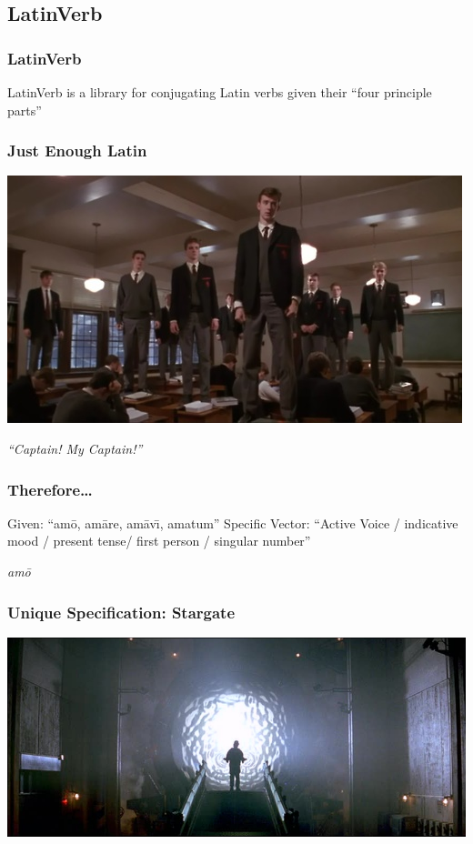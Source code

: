 \documentclass[slidestop,compress,mathserif]{beamer}
\begin{document}
\subsection{LatinVerb} %
\label{sub:_modeling_thought_in_latinverb}

\begin{frame}
	\frametitle{LatinVerb}
	LatinVerb is a library for conjugating Latin verbs given their ``four principle parts''
\end{frame}

\begin{frame}
	\frametitle{Just Enough Latin}
	\vskip 0.5cm
	\begin{center}
		\includegraphics[scale=0.45]{img/captain.jpg}
	\end{center}
	
	\vskip 0.5cm
	\begin{center}
		\emph{``Captain!  My Captain!''}
	\end{center}
	
\end{frame}

\begin{frame}
	\frametitle{Therefore\ldots}
	Given:  ``am\={o}, am\={a}re, am\={a}v\={\i}, amatum''
	\vskip 0.5cm
	Specific Vector: ``Active Voice / indicative mood / present tense/ first person / singular number'' 
	\vskip 0.5cm
	\begin{center}
		\emph{am\={o}}
	\end{center}
\end{frame}

\begin{frame}
	\frametitle{Unique Specification:  Stargate}
	\includegraphics[scale=0.25]{img/stargate.jpg}
	\vskip 0.5cm
\end{frame}
\end{document}
